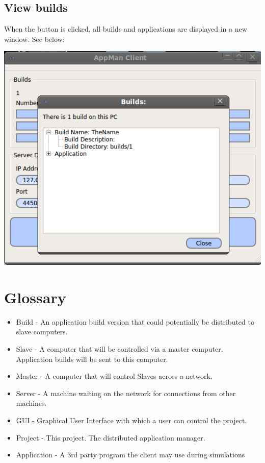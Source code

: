 \documentclass[a4paper,12pt,final]{article}
\begin{document}
\subsection{View builds}
When the button is clicked, all builds and applications are displayed in a new window. See below:


\begin{center}
  	\includegraphics[scale=0.4]{SlaveBuilds.png}
 \end{center}


\newpage
\section{Glossary}
\begin{itemize}
\item{Build - An application build version that could potentially be distributed to slave computers.}
\item{Slave - A computer that will be controlled via a master computer. Application builds will be sent to this computer.}
\item{Master - A computer that will control Slaves across a network.}
\item{Server - A machine waiting on the network for connections from other machines.}
\item{GUI - Graphical User Interface with which a user can control the project.}
\item{Project - This project. The distributed application manager.}
\item{Application - A 3rd party program the client may use during simulations}
\end{itemize}
\end{document}
